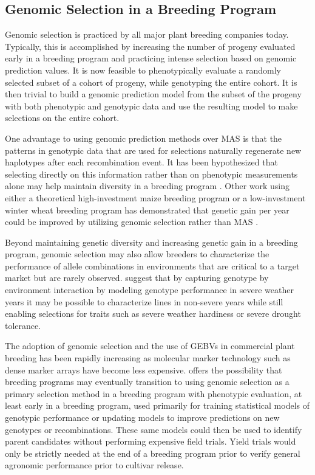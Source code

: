 \subsection*{Genomic Selection in a Breeding Program}

Genomic selection is practiced by all major plant breeding companies today. 
Typically, this is accomplished by increasing the number of progeny evaluated
early in a breeding program and practicing intense selection based on genomic
prediction values. It is now feasible to phenotypically evaluate a randomly
selected subset of a cohort of progeny, while genotyping the entire cohort. It is
then trivial to build a genomic prediction model from the subset of the progeny
with both phenotypic and genotypic data and use the resulting model to make 
selections on the entire cohort. 

One advantage to using genomic prediction methods over MAS is that the 
patterns in genotypic data that are used for selections naturally regenerate
new haplotypes after each recombination event. It has been hypothesized that 
selecting directly on this information rather than on phenotypic measurements
alone may help maintain diversity in a breeding program \citep{daetwyler2007}.
Other work using either a theoretical high-investment maize breeding program
or a low-investment winter wheat breeding program has demonstrated that genetic 
gain per year could be improved by utilizing genomic selection 
rather than MAS \citep{heffner2010}.

Beyond maintaining genetic diversity and increasing genetic gain in a breeding program, 
genomic selection may also allow breeders to characterize the performance of 
allele combinations in environments that are critical to a target market but
are rarely observed. \citet{heffner2009} suggest that by capturing genotype 
by environment interaction by modeling genotype performance
in severe weather years it may be possible to characterize 
lines in non-severe years while still enabling selections for traits such as
severe weather hardiness or severe drought tolerance.

The adoption of genomic selection and the use of GEBVs in commercial plant
breeding has been rapidly increasing as molecular marker technology such 
as dense marker arrays have become less expensive. \citet{heffner2009} 
offers the possibility that breeding programs may eventually transition 
to using genomic selection as a primary selection method
in a breeding program with phenotypic evaluation, at least early in a breeding 
program,  used primarily for training statistical models of genotypic 
performance or updating models to improve predictions on new genotypes 
or recombinations. These same models could then be used to identify 
parent candidates without performing expensive field trials.
Yield trials would only be strictly needed at the end of a breeding program
prior to verify general agronomic performance prior to cultivar release.

